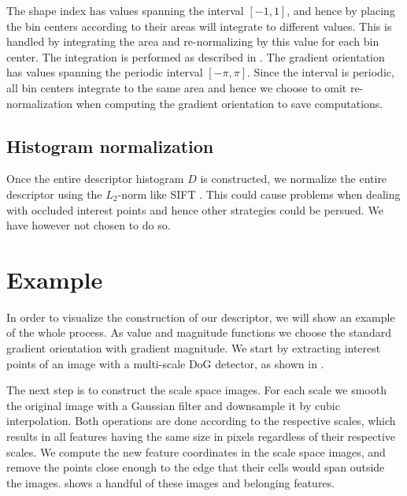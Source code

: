 \documentclass[thesis.tex]{subfiles}
\begin{document}
The shape index has values spanning the interval $[-1,1]$, and hence by placing the bin centers according to  their areas will integrate to different values. This is handled by integrating the area and re-normalizing by this value for each bin center. The integration is performed as described in . The gradient orientation has values spanning the periodic interval $[-\pi,\pi]$. Since the interval is periodic, all bin centers integrate to the same area and hence we choose to omit re-normalization when computing the gradient orientation to save computations.
%
\subsection{Histogram normalization}
Once the entire descriptor histogram $D$ is constructed, we normalize the entire descriptor using the $L_2$-norm like SIFT \cite{lowe2004distinctive}. This could cause problems when dealing with occluded interest points and hence other strategies could be persued. We have however not chosen to do so.

%
\section{Example}
%
In order to visualize the construction of our descriptor, we will show an example of the whole process. As value and magnitude functions we choose the standard gradient orientation with gradient magnitude. We start by extracting interest points of an image with a multi-scale DoG detector, as shown in .


The next step is to construct the scale space images. For each scale we smooth the original image with a Gaussian filter and downsample it by cubic interpolation. Both operations are done according to the respective scales, which results in all features having the same size in pixels regardless of their respective scales. We compute the new feature coordinates in the scale space images, and remove the points close enough to the edge that their cells would span outside the images.  shows a handful of these images and belonging features.
\end{document}
